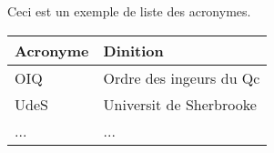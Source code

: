 Ceci est un exemple de liste des acronymes.

\begin{center}
\begin{tabular}{ll}
\hline
\textbf{Acronyme} & \textbf{Dinition} \\ \hline\hline
OIQ  & Ordre des ingeurs du Qc   \\
UdeS & Universit de Sherbrooke         \\
...  & ... \\
\hline
\end{tabular}
\end{center}
